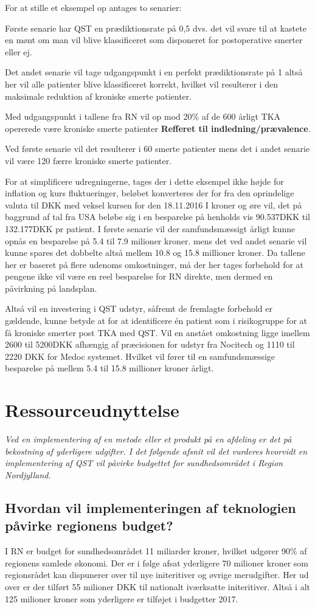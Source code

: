 For at stille et eksempel op antages to senarier:

Første senarie har QST en prædiktionsrate på 0,5 dvs. det vil svare til at kastete en mønt om man vil blive klassificeret som disponeret for postoperative smerter eller ej.

Det andet senarie vil tage udgangspunkt i en perfekt prædiktionsrate på 1 altså her vil alle patienter blive klassificeret korrekt, hvilket vil resulterer i den maksimale  reduktion af kroniske smerte patienter.

Med udgangspunkt i tallene fra RN vil op mod 20\% af de 600 årligt TKA opererede være kroniske smerte patienter \textbf{Refferet til indledning/prævalence}.

Ved første senarie vil det resulterer i 60 smerte patienter mens det i andet senarie vil være 120 færre kroniske smerte patienter. 

For at simplificere udregningerne, tages der i dette eksempel ikke højde for inflation og kurs fluktueringer, beløbet konverteres der for fra den oprindelige valuta til DKK med veksel kursen for den 18.11.2016
I kroner og øre vil, det på baggrund af tal fra USA beløbe sig i en besparelse på henholds vis 90.537DKK til 132.177DKK pr patient. I første senarie vil der samfundsmæssigt årligt kunne opnås en besparelse på 5.4 til 7.9 milioner kroner. mens det ved andet senarie vil kunne spares det dobbelte altså mellem 10.8 og 15.8 millioner kroner. Da tallene her er baseret på flere udenoms omkostninger, må der her tages forbehold for at pengene ikke vil være en reel besparelse for RN direkte, men dermed en påvirkning på landsplan.

Altså vil en investering i QST udstyr, såfremt de fremlagte forbehold er gældende, kunne betyde at for at identificere én patient som i risikogruppe for at få kroniske smerter post TKA med QST. Vil en anstået omkostning ligge imellem 2600 til 5200DKK afhængig af præcisionen for udstyr fra Nocitech og 1110 til 2220 DKK for Medoc systemet. Hvilket vil fører til en samfundsmæssige besparelse på mellem 5.4 til 15.8 millioner kroner årligt.
\section{Ressourceudnyttelse}
\textit{Ved en implementering af en metode eller et produkt på en afdeling er det på bekostning af yderligere udgifter. I det følgende afsnit vil det vurderes hvorvidt en implementering af QST vil påvirke budgettet for sundhedsområdet i Region Nordjylland. }
\subsection{Hvordan vil implementeringen af teknologien påvirke regionens budget?}
I RN er budget for sundhedsområdet 11 miliarder kroner, hvilket udgører 90\% af regionens samlede økonomi. \citep{RnBudget17}  Der er i følge  afsat yderligere 70 milioner kroner som regionsrådet kan dispunerer over til nye initeritiver og øvrige merudgifter. Her ud over er der tilført 55 milioner DKK til nationalt iværksatte initeritiver. Altså i alt 125 milioner kroner som yderligere er tilføjet i budgetter 2017.

